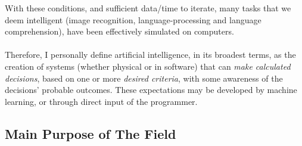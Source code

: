 \documentclass[10pt,a4paper]{article}
\begin{document}
				With these conditions, and sufficient data/time to iterate, many tasks that we deem intelligent (image recognition, language-processing and language comprehension), have been effectively simulated on computers.
				\\\\
				Therefore, I personally define artificial intelligence, in its broadest terms, as the creation of systems (whether physical or in software) that can \textsl{make calculated decisions}, based on one or more \textsl{desired criteria}, with some awareness of the decisions' probable outcomes. These expectations may be developed by machine learning, or through direct input of the programmer.
		
			\subsection{Main Purpose of The Field}
		
\end{document}
